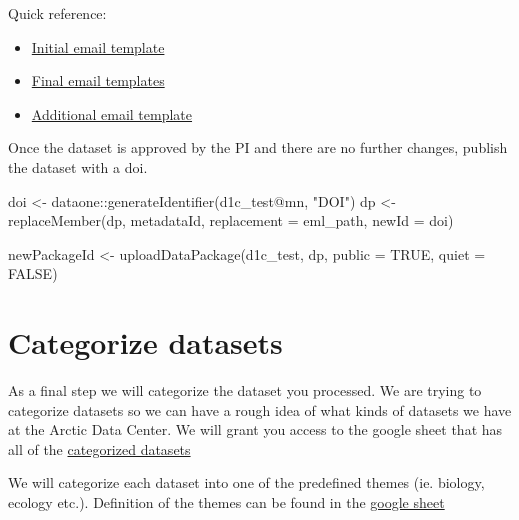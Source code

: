 \documentclass[
  letterpaper,
  DIV=11,
  numbers=noendperiod]{scrreprt}
\newenvironment{Shaded}{\begin{snugshade}}{\end{snugshade}}
\newcommand{\AttributeTok}[1]{\textcolor[rgb]{0.40,0.45,0.13}{#1}}
\newcommand{\ConstantTok}[1]{\textcolor[rgb]{0.56,0.35,0.01}{#1}}
\newcommand{\FunctionTok}[1]{\textcolor[rgb]{0.28,0.35,0.67}{#1}}
\newcommand{\NormalTok}[1]{\textcolor[rgb]{0.00,0.23,0.31}{#1}}
\newcommand{\OtherTok}[1]{\textcolor[rgb]{0.00,0.23,0.31}{#1}}
\newcommand{\SpecialCharTok}[1]{\textcolor[rgb]{0.37,0.37,0.37}{#1}}
\newcommand{\StringTok}[1]{\textcolor[rgb]{0.13,0.47,0.30}{#1}}
\providecommand{\tightlist}{%
  \setlength{\itemsep}{0pt}\setlength{\parskip}{0pt}}\usepackage{longtable,booktabs,array}
\begin{document}
Quick reference:

\begin{itemize}
\tightlist
\item
  \href{https://nceas.github.io/datateam-training/reference/email-templates.html\#initial-email-template}{Initial
  email template}
\item
  \href{https://nceas.github.io/datateam-training/reference/email-templates.html\#final-email-templates}{Final
  email templates}
\item
  \href{https://nceas.github.io/datateam-training/reference/email-templates.html\#additional-email-templates}{Additional
  email template}
\end{itemize}

Once the dataset is approved by the PI and there are no further changes,
publish the dataset with a doi.

\begin{Shaded}
\begin{Highlighting}[]
\NormalTok{doi }\OtherTok{\textless{}{-}}\NormalTok{ dataone}\SpecialCharTok{::}\FunctionTok{generateIdentifier}\NormalTok{(d1c\_test}\SpecialCharTok{@}\NormalTok{mn, }\StringTok{"DOI"}\NormalTok{)}
\NormalTok{dp }\OtherTok{\textless{}{-}} \FunctionTok{replaceMember}\NormalTok{(dp, metadataId, }\AttributeTok{replacement =}\NormalTok{ eml\_path, }\AttributeTok{newId =}\NormalTok{ doi)}

\NormalTok{newPackageId }\OtherTok{\textless{}{-}} \FunctionTok{uploadDataPackage}\NormalTok{(d1c\_test, dp, }\AttributeTok{public =} \ConstantTok{TRUE}\NormalTok{, }\AttributeTok{quiet =} \ConstantTok{FALSE}\NormalTok{)}
\end{Highlighting}
\end{Shaded}

\hypertarget{categorize-datasets}{%
\section{Categorize datasets}\label{categorize-datasets}}

As a final step we will categorize the dataset you processed. We are
trying to categorize datasets so we can have a rough idea of what kinds
of datasets we have at the Arctic Data Center. We will grant you access
to the google sheet that has all of the
\href{https://docs.google.com/spreadsheets/d/1S_7iW0UBZLZoJBrHXTW5fbHH-NOuOb6xLghraPA4Kf4/edit\#gid=1479370118}{categorized
datasets}

We will categorize each dataset into one of the predefined themes (ie.
biology, ecology etc.). Definition of the themes can be found in the
\href{https://docs.google.com/document/d/1rqHk9SCH9JvdSnIJovYVE1YF4IF4_yNxFfCOJMI8xjk/edit}{google
sheet}
\end{document}
